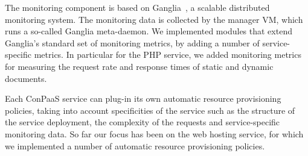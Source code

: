 
The monitoring component is based on Ganglia~\cite{ganglia}, a
scalable distributed monitoring system. The monitoring data is
collected by the manager VM, which runs a so-called Ganglia
meta-daemon. We implemented modules that extend Ganglia's standard set
of monitoring metrics, by adding a number of service-specific
metrics. In particular for the PHP service, we added monitoring
metrics for measuring the request rate and response times of static
and dynamic documents.


Each ConPaaS service can plug-in its own automatic resource
provisioning policies, taking into account specificities of the
service such as the structure of the service deployment, the
complexity of the requests and service-specific monitoring data. So
far our focus has been on the web hosting service, for which we
implemented a number of automatic resource provisioning policies.




 


